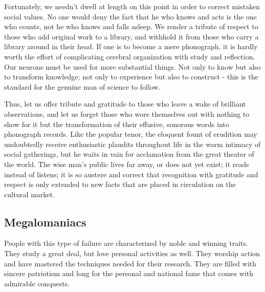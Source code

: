 \documentclass{article}
\begin{document}
Fortunately, we needn’t dwell at length on this point in order to correct mistaken social values. No one would deny the fact that he who knows and acts is the one who counts, not he who knows and falls asleep. We render a tribute of respect to those who add original work to a library, and withhold it from those who carry a library around in their head. If one is to become a mere phonograph, it is hardly worth the effort of complicating cerebral organization with study and reflection. Our neurons must be used for more substantial things. Not only to know but also to transform knowledge; not only to experience but also to construct - this is the standard for the genuine man of science to follow.

Thus, let us offer tribute and gratitude to those who leave a wake of brilliant observations, and let us forget those who wore themselves out with nothing to show for it but the transformation of their effusive, sonorous words into phonograph records. Like the popular tenor, the eloquent fount of erudition may undoubtedly receive enthusiastic plaudits throughout life in the warm intimacy of social gatherings, but he waits in vain for acclamation from the great theater of the world. The wise man’s public lives far away, or does not yet exist; it reads instead of listens; it is so austere and correct that recognition with gratitude and respect is only extended to new facts that are placed in circulation on the cultural market.

\subsection*{Megalomaniacs}

People with this type of failure are characterized by noble and winning traits. They study a great deal, but love personal activities as well. They worship action and have mastered the techniques needed for their research. They are filled with sincere patriotism and long for the personal and national fame that comes with admirable conquests.
\end{document}
